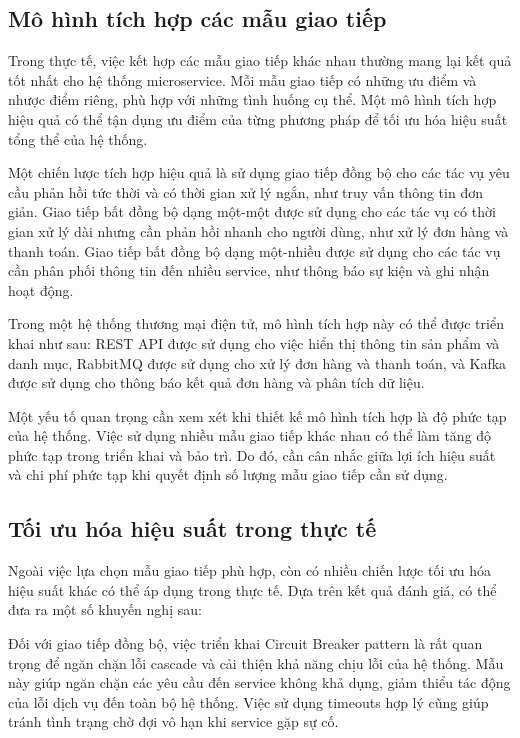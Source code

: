 \subsection{Mô hình tích hợp các mẫu giao tiếp}
Trong thực tế, việc kết hợp các mẫu giao tiếp khác nhau thường mang lại kết quả tốt nhất cho hệ thống microservice. Mỗi mẫu giao tiếp có những ưu điểm và nhược điểm riêng, phù hợp với những tình huống cụ thể. Một mô hình tích hợp hiệu quả có thể tận dụng ưu điểm của từng phương pháp để tối ưu hóa hiệu suất tổng thể của hệ thống.

Một chiến lược tích hợp hiệu quả là sử dụng giao tiếp đồng bộ cho các tác vụ yêu cầu phản hồi tức thời và có thời gian xử lý ngắn, như truy vấn thông tin đơn giản. Giao tiếp bất đồng bộ dạng một-một được sử dụng cho các tác vụ có thời gian xử lý dài nhưng cần phản hồi nhanh cho người dùng, như xử lý đơn hàng và thanh toán. Giao tiếp bất đồng bộ dạng một-nhiều được sử dụng cho các tác vụ cần phân phối thông tin đến nhiều service, như thông báo sự kiện và ghi nhận hoạt động.

Trong một hệ thống thương mại điện tử, mô hình tích hợp này có thể được triển khai như sau: REST API được sử dụng cho việc hiển thị thông tin sản phẩm và danh mục, RabbitMQ được sử dụng cho xử lý đơn hàng và thanh toán, và Kafka được sử dụng cho thông báo kết quả đơn hàng và phân tích dữ liệu.

Một yếu tố quan trọng cần xem xét khi thiết kế mô hình tích hợp là độ phức tạp của hệ thống. Việc sử dụng nhiều mẫu giao tiếp khác nhau có thể làm tăng độ phức tạp trong triển khai và bảo trì. Do đó, cần cân nhắc giữa lợi ích hiệu suất và chi phí phức tạp khi quyết định số lượng mẫu giao tiếp cần sử dụng.

\subsection{Tối ưu hóa hiệu suất trong thực tế}
Ngoài việc lựa chọn mẫu giao tiếp phù hợp, còn có nhiều chiến lược tối ưu hóa hiệu suất khác có thể áp dụng trong thực tế. Dựa trên kết quả đánh giá, có thể đưa ra một số khuyến nghị sau:

Đối với giao tiếp đồng bộ, việc triển khai Circuit Breaker pattern là rất quan trọng để ngăn chặn lỗi cascade và cải thiện khả năng chịu lỗi của hệ thống. Mẫu này giúp ngăn chặn các yêu cầu đến service không khả dụng, giảm thiểu tác động của lỗi dịch vụ đến toàn bộ hệ thống. Việc sử dụng timeouts hợp lý cũng giúp tránh tình trạng chờ đợi vô hạn khi service gặp sự cố.

